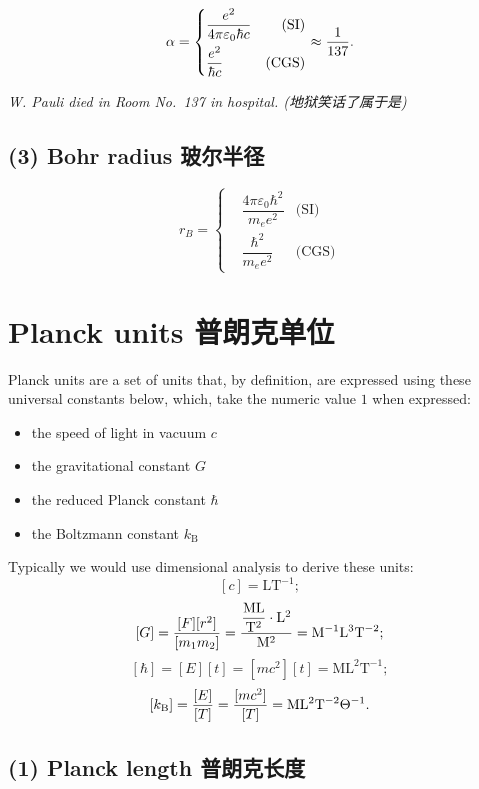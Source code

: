 \[\alpha = \left\{
\begin{aligned}
& \dfrac{e^2}{4 \pi \varepsilon_0 \hbar c} & \text{(SI)} \\
& \dfrac{e^2}{\hbar c} & \text{(CGS)}
\end {aligned}
\right.
\approx {1 \over 137}.
\]

\emph{W. Pauli died in Room No.~137 in hospital. (地狱笑话了属于是)}

\subsection*{(3) Bohr radius
玻尔半径}\label{bohr-radius-ux73bbux5c14ux534aux5f84}

\[r_B = \left\{
\begin{aligned}
& \dfrac{4 \pi \varepsilon_0 \hbar^2}{m_e e^2} & \text{(SI)} \\
& \dfrac{\hbar^2}{m_ee^2} & \text{(CGS)}
\end {aligned}
\right.\]

\section{Planck units
普朗克单位}\label{planck-units-ux666eux6717ux514bux5355ux4f4d}

Planck units are a set of units that, by definition, are expressed using
these universal constants below, which, take the numeric value \(1\)
when expressed:

\begin{itemize}
\tightlist{}
\item
  the speed of light in vacuum \(c\)
\item
  the gravitational constant \(G\)
\item
  the reduced Planck constant \(\hbar\)
\item
  the Boltzmann constant \(k_\mathrm{B}\)
\end{itemize}

Typically we would use dimensional analysis to derive these units:
\[[c] = \mathrm{LT^{-1}};\]
\[[G] = {[F][r^2] \over [m_1m_2]} = \mathrm{\dfrac{ML}{T^2} \cdot L^2 \over M^2} = \mathrm{M^{-1}L^3T^{-2}};\]
\[[\hbar] = [E][t] = [mc^2][t] = \mathrm{ML^2T^{-1}};\]
\[[k_\mathrm{B}] = {[E] \over [T]} = {[mc^2] \over [T]} = \mathrm{ML^2T^{-2}\Theta^{-1}}.\]

\subsection*{(1) Planck length
普朗克长度}\label{planck-length-ux666eux6717ux514bux957fux5ea6}

